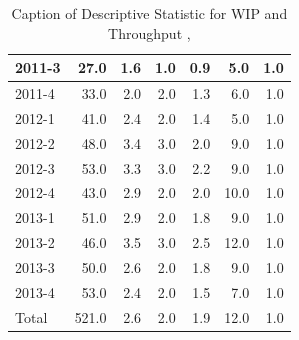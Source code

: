 \documentclass[UKenglish]{ifimaster}  %
\begin{document}
\begin{table}[!htbp]
\begin{adjustwidth}{-2.5cm}{}
{{\begin{tabular}{ | l | r | r | r | r | r | r | }
2011-3 & 27.0 & 1.6 & 1.0 & 0.9 & 5.0 & 1.0\\ \hline
2011-4 & 33.0 & 2.0 & 2.0 & 1.3 & 6.0 & 1.0\\ \hline
2012-1 & 41.0 & 2.4 & 2.0 & 1.4 & 5.0 & 1.0\\ \hline
2012-2 & 48.0 & 3.4 & 3.0 & 2.0 & 9.0 & 1.0\\ \hline
2012-3 & 53.0 & 3.3 & 3.0 & 2.2 & 9.0 & 1.0\\ \hline
2012-4 & 43.0 & 2.9 & 2.0 & 2.0 & 10.0 & 1.0\\ \hline
2013-1 & 51.0 & 2.9 & 2.0 & 1.8 & 9.0 & 1.0\\ \hline
2013-2 & 46.0 & 3.5 & 3.0 & 2.5 & 12.0 & 1.0\\ \hline
2013-3 & 50.0 & 2.6 & 2.0 & 1.8 & 9.0 & 1.0\\ \hline
2013-4 & 53.0 & 2.4 & 2.0 & 1.5 & 7.0 & 1.0\\ \hline
Total & 521.0 & 2.6 & 2.0 & 1.9 & 12.0 & 1.0\\ \hline
\end{tabular}
}
}
\end{adjustwidth}
\caption[Optional caption for list of figures]{Caption of Descriptive Statistic for WIP and Throughput  , }
\label{DS:9:1}
\end{table}
\end{document}
